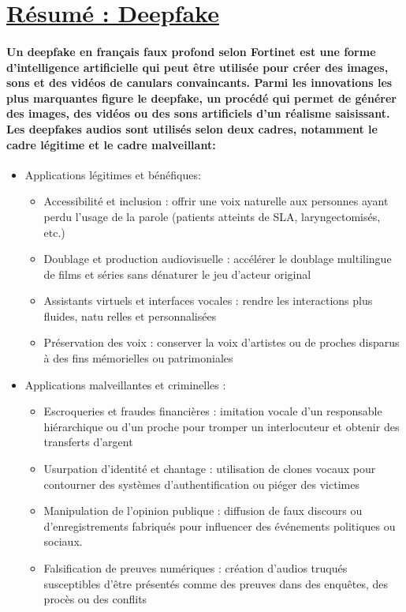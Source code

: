 \documentclass{article}
\begin{document}
\section{\underline{Résumé : Deepfake }}

\paragraph{ Un deepfake en français faux profond selon Fortinet est une forme d’intelligence artificielle qui peut être utilisée pour créer des images, sons et des vidéos de canulars convaincants.  Parmi les innovations les plus marquantes figure le deepfake, un procédé qui permet de générer des images, des vidéos ou des sons artificiels d’un réalisme saisissant. 
 Les deepfakes audios sont utilisés selon deux cadres, notamment le cadre légitime et le cadre malveillant:}
 
\begin{itemize}

\item Applications légitimes et bénéfiques:
\begin{itemize} 

\item  Accessibilité et inclusion : offrir une voix naturelle aux personnes ayant perdu l’usage
 de la parole (patients atteints de SLA, laryngectomisés, etc.)
\item  Doublage et production audiovisuelle : accélérer le doublage multilingue de films et
 séries sans dénaturer le jeu d’acteur original
\item   Assistants virtuels et interfaces vocales : rendre les interactions plus fluides, natu
relles et personnalisées
\item  Préservation des voix : conserver la voix d’artistes ou de proches disparus à des fins
 mémorielles ou patrimoniales

\end{itemize}

\item  Applications malveillantes et criminelles : 
 
\begin{itemize} 

\item Escroqueries et fraudes financières : imitation vocale d’un responsable hiérarchique ou d’un proche pour tromper un interlocuteur et obtenir des transferts d’argent

\item  Usurpation d’identité et chantage : utilisation de clones vocaux pour contourner des systèmes d’authentification ou piéger des victimes

\item Manipulation de l’opinion publique : diffusion de faux discours ou d’enregistrements fabriqués pour influencer des événements politiques ou sociaux.

\item  Falsification de preuves numériques : création d’audios truqués susceptibles d’être présentés comme des preuves dans des enquêtes, des procès ou des conflits


\end{itemize}
\end{itemize}
\end{document}
